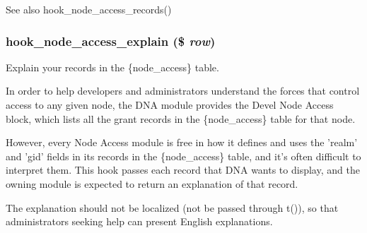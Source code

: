 \begin{DoxySeeAlso}{See also}
hook\_\-node\_\-access\_\-records() 
\end{DoxySeeAlso}
\hypertarget{group__hooks_gaeedf3adea0813fb3631f26d0de83a68d}{
\subsubsection[{hook\_\-node\_\-access\_\-explain}]{\setlength{\rightskip}{0pt plus 5cm}hook\_\-node\_\-access\_\-explain (\$ {\em row})}}
\label{group__hooks_gaeedf3adea0813fb3631f26d0de83a68d}
Explain your records in the \{node\_\-access\} table.

In order to help developers and administrators understand the forces that control access to any given node, the DNA module provides the Devel Node Access block, which lists all the grant records in the \{node\_\-access\} table for that node.

However, every Node Access module is free in how it defines and uses the 'realm' and 'gid' fields in its records in the \{node\_\-access\} table, and it's often difficult to interpret them. This hook passes each record that DNA wants to display, and the owning module is expected to return an explanation of that record.

The explanation should not be localized (not be passed through t()), so that administrators seeking help can present English explanations.


